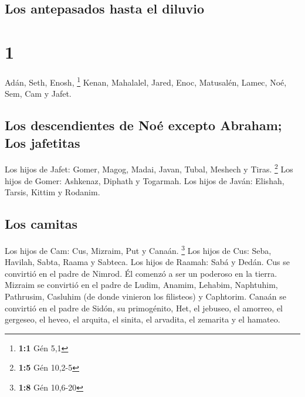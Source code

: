 \hypertarget{los-antepasados-hasta-el-diluvio}{%
\subsection{Los antepasados \hspace{0pt}\hspace{0pt}hasta el
diluvio}\label{los-antepasados-hasta-el-diluvio}}

\hypertarget{section}{%
\section{1}\label{section}}

 Adán, Seth, Enosh, \footnote{\textbf{1:1} Gén 5,1}
 Kenan, Mahalalel, Jared,  Enoc, Matusalén,
Lamec,  Noé, Sem, Cam y Jafet.

\hypertarget{los-descendientes-de-nouxe9-excepto-abraham-los-jafetitas}{%
\subsection{Los descendientes de Noé excepto Abraham; Los
jafetitas}\label{los-descendientes-de-nouxe9-excepto-abraham-los-jafetitas}}

 Los hijos de Jafet: Gomer, Magog, Madai, Javan, Tubal,
Meshech y Tiras. \footnote{\textbf{1:5} Gén 10,2-5}  Los
hijos de Gomer: Ashkenaz, Diphath y Togarmah.  Los hijos
de Javán: Elishah, Tarsis, Kittim y Rodanim.

\hypertarget{los-camitas}{%
\subsection{Los camitas}\label{los-camitas}}

 Los hijos de Cam: Cus, Mizraim, Put y Canaán. \footnote{\textbf{1:8}
  Gén 10,6-20}  Los hijos de Cus: Seba, Havilah, Sabta,
Raama y Sabteca. Los hijos de Raamah: Sabá y Dedán.  Cus
se convirtió en el padre de Nimrod. Él comenzó a ser un poderoso en la
tierra.  Mizraim se convirtió en el padre de Ludim,
Anamim, Lehabim, Naphtuhim,  Pathrusim, Casluhim (de
donde vinieron los filisteos) y Caphtorim.  Canaán se
convirtió en el padre de Sidón, su primogénito, Het,  el
jebuseo, el amorreo, el gergeseo,  el heveo, el arquita,
el sinita,  el arvadita, el zemarita y el hamateo.

